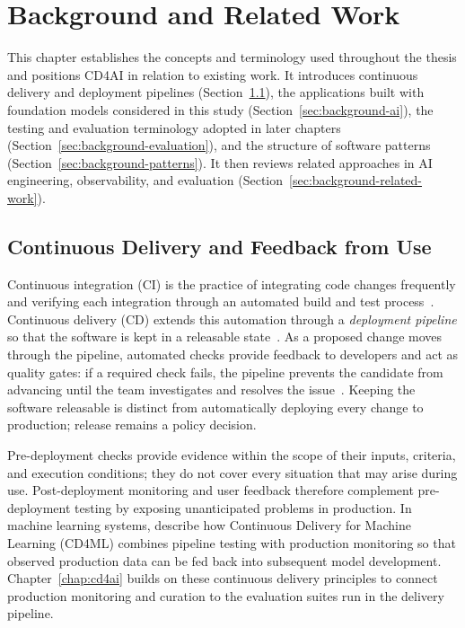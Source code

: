 \chapter{Background and Related Work}
\label{chap:background}

This chapter establishes the concepts and terminology used throughout the
thesis and positions CD4AI in relation to existing work. It introduces
continuous delivery and deployment pipelines
(Section~\ref{sec:background-delivery}), the applications built with foundation
models considered in this study (Section~\ref{sec:background-ai}), the testing
and evaluation terminology adopted in later chapters
(Section~\ref{sec:background-evaluation}), and the structure of software
patterns (Section~\ref{sec:background-patterns}). It then reviews related
approaches in AI engineering, observability, and evaluation
(Section~\ref{sec:background-related-work}).

\section{Continuous Delivery and Feedback from Use}
\label{sec:background-delivery}

Continuous integration (CI) is the practice of integrating code changes
frequently and verifying each integration through an automated build and test
process~\parencite{Fowler:ContinuousIntegration:2024}. Continuous delivery (CD)
extends this automation through a \emph{deployment pipeline} so that the
software is kept in a releasable state~\parencite{Humble:ContinuousDelivery:2010}.
As a proposed change moves through the pipeline, automated checks provide
feedback to developers and act as quality gates: if a required check fails, the
pipeline prevents the candidate from advancing until the team investigates and
resolves the issue~\parencite{Humble:ContinuousDelivery:2010}. Keeping the
software releasable is distinct from automatically deploying every change to
production; release remains a policy decision.

Pre-deployment checks provide evidence within the scope of their inputs,
criteria, and execution conditions; they do not cover every situation that may
arise during use. Post-deployment monitoring and user feedback therefore
complement pre-deployment testing by exposing unanticipated problems in
production. In machine learning systems, \textcite{Sato:ContinuousDelivery4ML:2019}
describe how Continuous Delivery for Machine Learning (CD4ML) combines pipeline
testing with production monitoring so that observed production data can be fed
back into subsequent model development. Chapter~\ref{chap:cd4ai} builds on
these continuous delivery principles to connect production monitoring and
curation to the evaluation suites run in the delivery pipeline.

